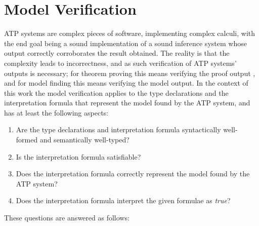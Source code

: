\documentclass[letterpaper]{article}
\begin{document}
\section{Model Verification}
\label{Verification}

ATP systems are complex pieces of software, implementing complex calculi, with the end goal
being a sound implementation of a sound inference system whose output correctly corroborates the
result obtained.
The reality is that the complexity leads to incorrectness, and as such verification of ATP systems'
outputs is necessary; for theorem proving this means verifying the proof output \cite{Sut06},
and for model finding this means verifying the model output.
In the context of this work the model verification applies to the type declarations and 
the \small{interpretation} formula that represent the model found by the ATP system, and
has at least the following aspects:
\begin{enumerate}
\item Are the type declarations and interpretation formula syntactically well-formed 
      and semantically well-typed?
\item Is the interpretation formula satisfiable?
\item Does the interpretation formula correctly represent the model found by the ATP system?
\item Does the interpretation formula interpret the given formulae as {\em true}?
\end{enumerate}
\noindent
These questions are answered as follows:
\end{document}
